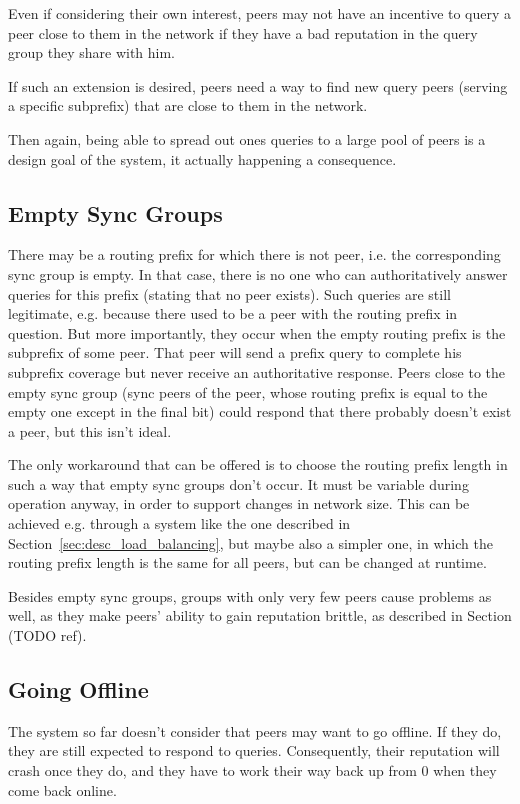 Even if considering their own interest, peers may not have an incentive to query
a peer close to them in the network if they have a bad reputation in the query
group they share with him.

If such an extension is desired, peers need a way to find new query peers
(serving a specific subprefix) that are close to them in the network.

Then again, being able to spread out ones queries to a large pool of peers is a
design goal of the system, it actually happening a consequence.

\subsection{Empty Sync Groups}
\label{sec:desc_empty_sync_groups}
There may be a routing prefix for which there is not peer, i.e. the
corresponding sync group is empty. In that case, there is no one who can
authoritatively answer queries for this prefix (stating that no peer exists).
Such queries are still legitimate, e.g. because there used to be a peer with the
routing prefix in question. But more importantly, they occur when the empty
routing prefix is the subprefix of some peer. That peer will send a prefix query
to complete his subprefix coverage but never receive an authoritative response.
Peers close to the empty sync group (sync peers of the peer, whose routing
prefix is equal to the empty one except in the final bit) could respond that
there probably doesn't exist a peer, but this isn't ideal.

The only workaround that can be offered is to choose the routing prefix length
in such a way that empty sync groups don't occur. It must be variable during
operation anyway, in order to support changes in network size. This can be
achieved e.g. through a system like the one described in
Section~\ref{sec:desc_load_balancing}, but maybe also a simpler one, in which
the routing prefix length is the same for all peers, but can be changed at
runtime.

Besides empty sync groups, groups with only very few peers cause problems as
well, as they make peers' ability to gain reputation brittle, as described in
Section (TODO ref).

\subsection{Going Offline}
The system so far doesn't consider that peers may want to go offline. If they
do, they are still expected to respond to queries. Consequently, their
reputation will crash once they do, and they have to work their way back up from
0 when they come back online.

